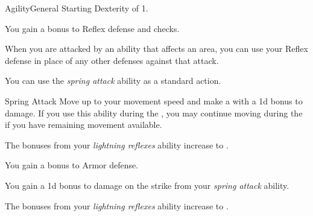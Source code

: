     \begin{feat}{Agility}{General}
        \featpre Starting Dexterity of 1.

         You gain a  bonus to Reflex defense and  checks.

         When you are attacked by an ability that affects an area, you can use your Reflex defense in place of any other defenses against that attack.

         You can use the \textit{spring attack} ability as a standard action.
        \begin{apability}{Spring Attack}
            Move up to your movement speed and make a  with a \plus1d bonus to damage.
            If you use this ability during the , you may continue moving during the  if you have remaining movement available.
        \end{apability}

         The bonuses from your \textit{lightning reflexes} ability increase to .

         You gain a  bonus to Armor defense.

         You gain a \plus1d bonus to damage on the strike from your \textit{spring attack} ability.

         The bonuses from your \textit{lightning reflexes} ability increase to .
    \end{feat}

